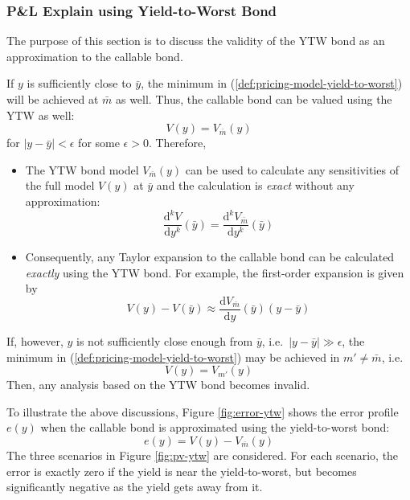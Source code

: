 \documentclass[10pt,a4paper]{article}
\newcommand{\dd}{\mathrm{d}}
\begin{document}
\subsubsection{P\&L Explain using Yield-to-Worst Bond}

The purpose of this section is to discuss the validity of the YTW bond as an approximation to the callable bond. 

If $y$ is sufficiently close to $\bar{y}$, the minimum in (\ref{def:pricing-model-yield-to-worst}) will be achieved at $\bar{m}$ as well. Thus, the callable bond can be valued using the YTW as well: 
\begin{equation}
V(y) = V_{\bar{m}}(y)
\end{equation}
for $|y - \bar{y}| < \epsilon$ for some $\epsilon > 0$. Therefore, 
\begin{itemize}
	\item The YTW bond model $V_{\bar{m}}(y)$ can be used to calculate any sensitivities of the full model $V(y)$ at $\bar{y}$ and the calculation is {\em exact} without any approximation:
	\begin{equation}
	\frac{\dd^k V}{\dd y^k}(\bar{y}) = \frac{\dd^k V_{\bar{m}}}{\dd y^k}(\bar{y})
	\end{equation}
	\item Consequently, any Taylor expansion to the callable bond can be calculated {\em exactly} using the YTW bond. For example, the first-order expansion is given by
	\begin{equation}
	V(y) - V(\bar{y}) \approx \frac{\dd V_{\bar{m}}}{\dd y}(\bar{y})(y - \bar{y})
	\end{equation}
\end{itemize}


If, however, $y$ is not sufficiently close enough from $\bar{y}$, i.e.\ $|y-\bar{y}| \gg \epsilon$, the minimum in (\ref{def:pricing-model-yield-to-worst})
may be achieved in $m' \ne \bar{m}$, i.e.\
\begin{equation}
V(y) = V_{m'}(y)
\end{equation}
Then, any analysis based on the YTW bond becomes invalid. 

To illustrate the above discussions, Figure \ref{fig:error-ytw} shows the error profile $e(y)$ when the callable bond is approximated using the yield-to-worst bond:
\begin{equation}
e(y) = V(y) - V_{\bar{m}}(y)
\end{equation}
The three scenarios in Figure \ref{fig:pv-ytw} are considered. 
For each scenario, the error is exactly zero if the yield is near the yield-to-worst, but becomes significantly negative as the yield gets away from it. 
\end{document}
